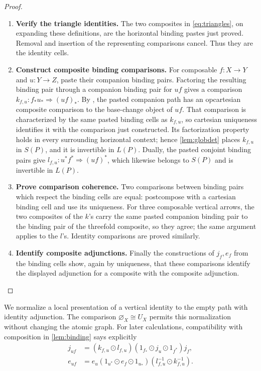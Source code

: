 \documentclass[11pt,reqno]{amsart}
\theoremstyle{plain}
\theoremstyle{definition}
\theoremstyle{remark}
\numberwithin{equation}{section}
\newcommand{\cell}{\mathrel{\Longrightarrow}}
\newcommand{\emp}[1]{\varnothing_{#1}}
\newcommand{\wh}{\mathbin{\odot}}
\begin{document}
\begin{proof}
\begin{enumerate}
\item \textbf{Verify the triangle identities.} The two composites in \cref{eq:triangles}, on expanding these
definitions, are the horizontal binding pastes just proved. Removal and
insertion of the representing comparisons cancel. Thus they are the
identity cells.

\item \textbf{Construct composite binding comparisons.} For composable $f:X\to Y$ and $u:Y\to Z$, paste their companion binding
pairs. Factoring the resulting binding pair through a companion binding
pair for $uf$ gives a comparison
$k_{f,u}:f_*u_*\cell(uf)_*$. By
\cite[Corollary 7.19]{CruttwellShulman2010}, the pasted companion path has
an opcartesian composite comparison to the base-change object of $uf$.
That comparison is characterized by the same pasted binding cells as
$k_{f,u}$, so cartesian uniqueness identifies it with the comparison just
constructed. Its factorization property holds in every surrounding
horizontal context; hence \cref{lem:globdet} places $k_{f,u}$ in $S(P)$,
and it is invertible in $L(P)$. Dually,
the pasted conjoint binding pairs give
$l_{f,u}:u^*f^*\cell(uf)^*$, which likewise belongs to $S(P)$ and is
invertible in $L(P)$.

\item \textbf{Prove comparison coherence.} Two comparisons between binding pairs which respect the binding cells are
equal: postcompose with a cartesian binding cell and use its uniqueness.
For three composable vertical arrows, the two composites of the $k$'s
carry the same pasted companion binding pair to the binding pair of the
threefold composite, so they agree; the same argument applies to the
$l$'s. Identity comparisons are proved similarly.

\item \textbf{Identify composite adjunctions.} Finally the constructions
of $j_f,e_f$ from the binding cells show, again by uniqueness, that these
comparisons identify the displayed adjunction for a composite with the
composite adjunction.\qedhere
\end{enumerate}
\end{proof}

We normalize a local presentation of a vertical identity to the empty path
with identity adjunction. The comparison $\emp X\cong U_X$ permits this
normalization without changing the atomic graph. For later calculations,
compatibility with composition in \cref{lem:binding} says explicitly
\begin{align}
 j_{uf}&=(k_{f,u}\wh l_{f,u})
       (1_{f_*}\wh j_u\wh1_{f^*})j_f,\label{eq:unitcomp}\\
 e_{uf}&=e_u(1_{u^*}\wh e_f\wh1_{u_*})
       (l_{f,u}^{-1}\wh k_{f,u}^{-1}).\label{eq:counitcomp}
\end{align}
\end{document}
